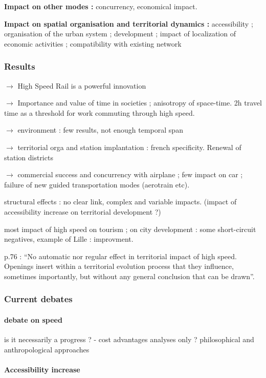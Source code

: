 \textbf{Impact on other modes : } concurrency, economical impact.


\textbf{Impact on spatial organisation and territorial dynamics : } accessibility ; organisation of the urban system ; development ; impact of localization of economic activities ; compatibility with existing network

\subsubsection{Results}

$\rightarrow$ High Speed Rail is a powerful innovation

$\rightarrow$ Importance and value of time in societies ; anisotropy of space-time. 2h travel time as a threshold for work commuting through high speed.

$\rightarrow$ environment : few results, not enough temporal span

$\rightarrow$ territorial orga and station implantation : french specificity. Renewal of station districts

$\rightarrow$ commercial success and concurrency with airplane ; few impact on car ; failure of new guided transportation modes (aerotrain etc).

structural effects : no clear link, complex and variable impacts. (impact of accessibility increase on territorial development ?)

most impact of high speed on tourism ; on city development : some short-circuit negatives, example of Lille : improvment.

p.76 : ``No automatic nor regular effect in territorial impact of high speed. Openings insert within a territorial evolution process that they influence, sometimes importantly, but without any general conclusion that can be drawn''.

\subsubsection{Current debates}

\paragraph{debate on speed}

is it necessarily a progress ? - cost advantages analyses only ? philosophical and anthropological approaches

\paragraph{Accessibility increase}

